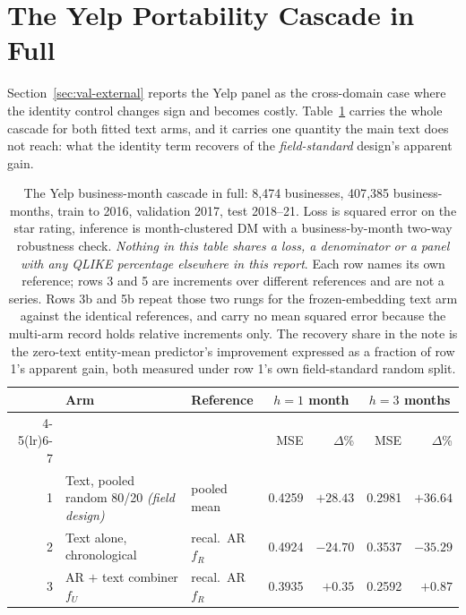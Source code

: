\FloatBarrier
\section{The Yelp Portability Cascade in Full}
\label{app:res-yelp}

Section~\ref{sec:val-external} reports the Yelp panel as the cross-domain
case where the identity control changes sign and becomes costly.
Table~\ref{tab:app-yelp} carries the whole cascade for both fitted text arms,
and it carries one
quantity the main text does not reach: what the identity term recovers of
the \emph{field-standard} design's apparent gain.

\begin{table}[htbp]
\centering
\caption[The Yelp cascade, both horizons]{The Yelp business-month cascade
in full: 8{,}474 businesses, 407{,}385 business-months, train to 2016,
validation 2017, test 2018--21. Loss is squared error on the star rating,
inference is month-clustered DM with a business-by-month two-way
robustness check. \emph{Nothing in this table shares a loss, a
denominator or a panel with any QLIKE percentage elsewhere in this report}.
Each row names its own reference; rows 3 and 5 are increments over
different references and are not a series. Rows 3b and 5b repeat those two
rungs for the frozen-embedding text arm against the identical references, and
carry no mean squared error because the multi-arm record holds relative
increments only. The recovery share in the note
is the zero-text entity-mean predictor's improvement expressed as a
fraction of row 1's apparent gain, both measured under row 1's own
field-standard random split.}
\label{tab:app-yelp}
\singlespacing\small
\setlength{\tabcolsep}{4pt}
\begin{tabular}{@{}rlp{}rrrr@{}}
\toprule
& Arm & Reference & \multicolumn{2}{c}{$h = 1$ month} & \multicolumn{2}{c}{$h = 3$ months} \\
\cmidrule(lr){4-5}\cmidrule(lr){6-7}
& & & MSE & $\Delta$\% & MSE & $\Delta$\% \\
\midrule
1 & Text, pooled random 80/20 \emph{(field design)} & pooled mean & 0.4259 & $+28.43$ & 0.2981 & $+36.64$ \\
2 & Text alone, chronological & recal.\ AR $f_R$ & 0.4924 & $-24.70$ & 0.3537 & $-35.29$ \\
3 & AR $+$ text combiner $f_U$ & recal.\ AR $f_R$ & 0.3935 & $+0.35$ & 0.2592 & $+0.87$ \\

\end{tabular}
\end{table}
